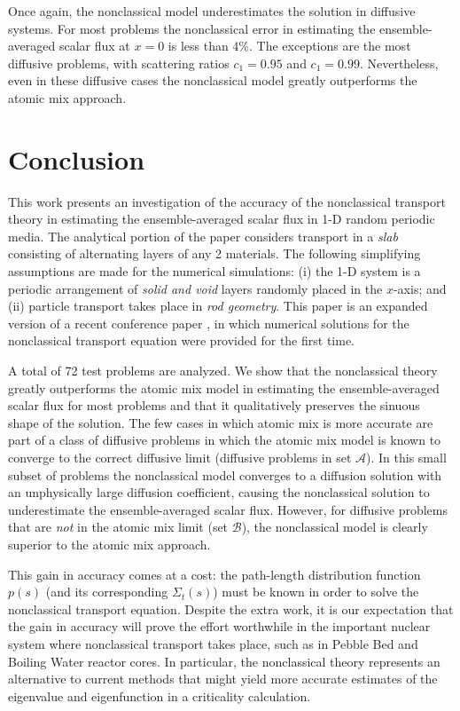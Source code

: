 \documentclass[12pt]{article}
\newcommand{\seta}{\mathcal{A}}
\newcommand{\setb}{\mathcal{B}}
\begin{document}
{Once again, the nonclassical model underestimates the solution in diffusive systems. For most problems the nonclassical error in estimating the ensemble-averaged scalar flux at $x=0$ is less than 4\%. The exceptions are the most diffusive problems, with scattering ratios $c_1 = 0.95$ and $c_1 = 0.99$. Nevertheless, even in these diffusive cases the nonclassical model greatly outperforms the atomic mix approach.

\section{Conclusion}\label{sec6}

This work presents an investigation of the accuracy of the nonclassical transport theory in estimating the ensemble-averaged scalar flux in 1-D random periodic media. The analytical portion of the paper considers transport in a {\em slab} consisting of alternating layers of any 2 materials. The following simplifying assumptions are made for the numerical simulations: (i) the 1-D system is a periodic arrangement of {\em solid and void} layers randomly placed in the $x$-axis; and (ii) particle transport takes place in {\em rod geometry}. This paper is an expanded version of a recent conference paper \cite{mc15}, in which numerical solutions for the nonclassical transport equation were provided for the first time. 

A total of 72 test problems are analyzed. We show that the nonclassical theory greatly outperforms the atomic mix model in estimating the ensemble-averaged scalar flux for most problems and that it qualitatively
preserves the sinuous shape of the solution. The few cases in which atomic mix is more accurate are part of a class of diffusive problems in which the atomic mix model is known to converge to the correct diffusive limit (diffusive problems in set $\seta$). In this small subset of problems the nonclassical model converges to a diffusion solution with an unphysically large diffusion coefficient, causing the nonclassical solution to underestimate the ensemble-averaged scalar flux. However, for diffusive problems that are {\em not} in the atomic mix limit (set $\setb$), the nonclassical model is clearly superior to the atomic mix approach.

This gain in accuracy comes at a cost: the path-length distribution function $p(s)$ (and its
corresponding $\Sigma_t(s)$) must be known in order to solve the nonclassical transport equation. Despite the extra work, it is our expectation that the gain in accuracy will prove the effort worthwhile in the important nuclear system where nonclassical transport takes place, such as in
Pebble Bed and Boiling Water reactor cores.
In particular, the nonclassical theory represents an alternative to current methods that might yield more accurate estimates of the eigenvalue and eigenfunction in a criticality calculation.

}
\end{document}
